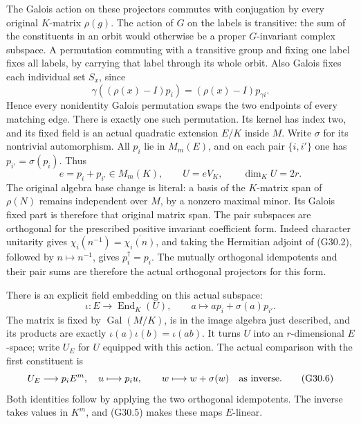 The Galois action on these projectors commutes with conjugation
by every original \(K\)-matrix \(\rho(g)\). The action
of \(G\) on the labels is transitive: the sum of the
constituents in an orbit would otherwise be a proper
\(G\)-invariant complex subspace. A permutation commuting
with a transitive group and fixing one label fixes all labels,
by carrying that label through its whole orbit. Also Galois
fixes each individual set \(S_x\), since
\[
 \gamma((\rho(x)-I)p_i)=(\rho(x)-I)p_{\gamma i}.
                                                               \tag{G30.3}
\]
Hence every nonidentity Galois permutation swaps the two
endpoints of every matching edge. There is exactly one such
permutation. Its kernel has index two, and its fixed field
is an actual quadratic extension \(E/K\) inside \(M\).
Write \(\sigma\) for its nontrivial automorphism.
All \(p_i\) lie in \(M_m(E)\), and on each pair
\(\{i,i'\}\) one has \(p_{i'}=\sigma(p_i)\).
Thus
\[
 e=p_i+p_{i'}\in M_m(K),\qquad U=eV_K,\qquad\dim_KU=2r.
                                                               \tag{G30.4}
\]
The original algebra base change is literal: a basis of the
\(K\)-matrix span of \(\rho(N)\) remains independent
over \(M\), by a nonzero maximal minor. Its Galois fixed
part is therefore that original matrix span.
The pair subspaces are orthogonal for the prescribed positive
invariant coefficient form. Indeed character unitarity gives
\(\chi_i(n^{-1})=\overline{\chi_i(n)}\), and taking the
Hermitian adjoint of (G30.2), followed by \(n\mapsto n^{-1}\),
gives \(p_i^\dagger=p_i\). The mutually orthogonal
idempotents and their pair sums are therefore the actual
orthogonal projectors for this form.

There is an explicit field embedding on this actual subspace:
\[
 \iota:E\longrightarrow\operatorname{End}_K(U),\qquad
             a\longmapsto a p_i+\sigma(a)p_{i'}.
                                                               \tag{G30.5}
\]
The matrix is fixed by \(\operatorname{Gal}(M/K)\),
is in the image algebra just described, and its products
are exactly \(\iota(a)\iota(b)=\iota(ab)\).
It turns \(U\) into an \(r\)-dimensional \(E\)-space;
write \(U_E\) for \(U\) equipped with this action.
The actual comparison with the first constituent is
\[
 U_E\longrightarrow p_iE^m,\quad u\longmapsto p_i u,
 \qquad w\longmapsto w+\sigma(w)\quad\hbox{as inverse}.
                                                               \tag{G30.6}
\]
Both identities follow by applying the two orthogonal
idempotents. The inverse takes values in \(K^m\), and
(G30.5) makes these maps \(E\)-linear.

